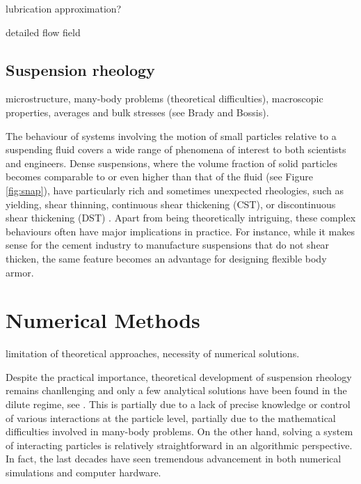 lubrication approximation?


detailed flow field \citep{zhu_gallaire_2016}



\section{Suspension rheology}
\label{sec:sus-rheo}

microstructure,
many-body problems (theoretical difficulties),
macroscopic properties, averages and bulk stresses (see Brady and Bossis).

The behaviour of systems involving the motion of small particles relative to a suspending fluid covers a wide range of phenomena of interest to both scientists and engineers. Dense suspensions, where the volume fraction of solid particles becomes comparable to or even higher than that of the fluid (see Figure \ref{fig:snap}), have particularly rich and sometimes unexpected rheologies, such as yielding, shear thinning, continuous shear thickening (CST), or discontinuous shear thickening (DST) \citep{mewis_wagner_book, Morton_Morris_2014, guazzelli_pouliquen_2018, Morris_annurev2020}. Apart from being theoretically intriguing, these complex behaviours often have major implications in practice. For instance, while it makes sense for the cement industry to manufacture suspensions that do not shear thicken, the same feature becomes an advantage for designing flexible body armor.



\chapter{Numerical Methods}



limitation of theoretical approaches,
necessity of numerical solutions.

Despite the practical importance, theoretical development of suspension rheology remains chanllenging and only a few analytical solutions have been found in the dilute regime, see \eg \cite{Einstein_1906, batchelor_green_1972b}. This is partially due to a lack of precise knowledge or control of various interactions at the particle level, partially due to the mathematical difficulties involved in many-body problems. On the other hand, solving a system of interacting particles is relatively straightforward in an algorithmic perspective. In fact, the last decades have seen tremendous advancement in both numerical simulations and computer hardware.

